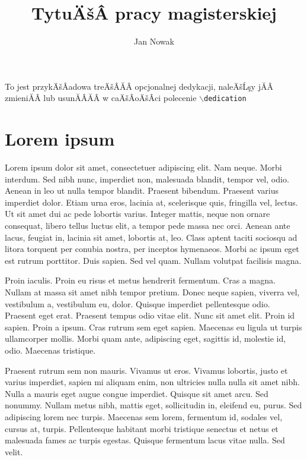 \documentclass[printmode]{mgr}
\title{TytuÄšÂ pracy magisterskiej}
\author{Jan Nowak}
\begin{document}

\maketitle %

\dedication{6cm}{To jest przykÄšÂadowa treÄšÂĂÂ opcjonalnej dedykacji,
  naleÄšĹşy jĂÂ zmieniĂÂ lub usunĂÂĂÂ w caÄšÂoÄšÂci polecenie
  \texttt{$\backslash$dedication}}

\tableofcontents %

\chapter{Lorem ipsum}
Lorem ipsum dolor sit amet, consectetuer adipiscing elit. Nam
neque. Morbi interdum. Sed nibh nunc, imperdiet non, malesuada
blandit, tempor vel, odio. Aenean in leo ut nulla tempor
blandit. Praesent bibendum. Praesent varius imperdiet dolor. Etiam
urna eros, lacinia at, scelerisque quis, fringilla vel, lectus. Ut sit
amet dui ac pede lobortis varius. Integer mattis, neque non ornare
consequat, libero tellus luctus elit, a tempor pede massa nec
orci. Aenean ante lacus, feugiat in, lacinia sit amet, lobortis at,
leo. Class aptent taciti sociosqu ad litora torquent per conubia
nostra, per inceptos hymenaeos. Morbi ac ipsum eget est rutrum
porttitor. Duis sapien. Sed vel quam. Nullam volutpat facilisis magna.

Proin iaculis. Proin eu risus et metus hendrerit fermentum. Cras a
magna. Nullam at massa sit amet nibh tempor pretium. Donec neque
sapien, viverra vel, vestibulum a, vestibulum eu, dolor. Quisque
imperdiet pellentesque odio. Praesent eget erat. Praesent tempus odio
vitae elit. Nunc sit amet elit. Proin id sapien. Proin a ipsum. Cras
rutrum sem eget sapien. Maecenas eu ligula ut turpis ullamcorper
mollis. Morbi quam ante, adipiscing eget, sagittis id, molestie id,
odio. Maecenas tristique.

Praesent rutrum sem non mauris. Vivamus ut eros. Vivamus lobortis,
justo et varius imperdiet, sapien mi aliquam enim, non ultricies nulla
nulla sit amet nibh. Nulla a mauris eget augue congue
imperdiet. Quisque sit amet arcu. Sed nonummy. Nullam metus nibh,
mattis eget, sollicitudin in, eleifend eu, purus. Sed adipiscing lorem
nec turpis. Maecenas sem lorem, fermentum id, sodales vel, cursus at,
turpis. Pellentesque habitant morbi tristique senectus et netus et
malesuada fames ac turpis egestas. Quisque fermentum lacus vitae
nulla. Sed velit.
\end{document}
